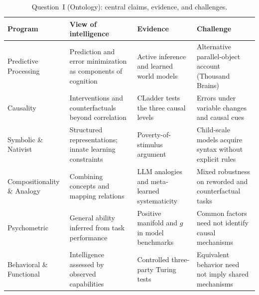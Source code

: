 \documentclass[acmsmall,screen,review,anonymous]{acmart}
\begin{document}
\begin{table}[t]
\caption{Question~I (Ontology): central claims, evidence, and challenges.}
\label{tab:ontology-framework}
\centering
\footnotesize
\setlength{\tabcolsep}{3pt}
\renewcommand{\arraystretch}{1.13}
\begin{tabularx}{\textwidth}{p{} Y Y Y}
\toprule
Program & View of intelligence & Evidence & Challenge \\
\midrule
Predictive Processing &
Prediction and error minimization as components of cognition~\citep{friston2010, clark2013} &
Active inference and learned world models~\citep{fountas2020deepactiveinferenceagents, hafner2020dreamcontrollearningbehaviors} &
Alternative parallel-object account (Thousand Brains)~\citep{hawkins2021thousand} \\
\addlinespace
Causality &
Interventions and counterfactuals beyond correlation~\citep{pearl2009, pearl2018} &
CLadder tests the three causal levels~\citep{jin2023cladder} &
Errors under variable changes and causal cues~\citep{jin2024largelanguagemodelsinfer, joshi-etal-2024-llms} \\
\addlinespace
Symbolic \& Nativist &
Structured representations; innate learning constraints~\citep{newellsimon1976, fodorpylyshyn1988, chomsky1959} &
Poverty-of-stimulus argument~\citep{aec7bd17-a4c8-3578-b764-35112067fc74} &
Child-scale models acquire syntax without explicit rules~\citep{warstadt2023babylm, huebner-etal-2021-babyberta} \\
\addlinespace
Compositionality \& Analogy &
Combining concepts and mapping relations~\citep{fodorpylyshyn1988, hofstadter2001} &
LLM analogies and meta-learned systematicity~\citep{Webb2022EmergentAR, Lake2023-ut} &
Mixed robustness on reworded and counterfactual tasks~\citep{lewis2024usingcounterfactualtasksevaluate, webb2025evidence} \\
\addlinespace
Psychometric &
General ability inferred from task performance~\citep{spearman1904} &
Positive manifold and $g$ in model benchmarks~\citep{burnell2023revealingstructurelanguagemodel} &
Common factors need not identify causal mechanisms~\citep{gardner1983, gould1996mismeasure} \\
\addlinespace
Behavioral \& Functional &
Intelligence assessed by observed capabilities~\citep{turing1950, dennett1987} &
Controlled three-party Turing tests~\citep{10.1145/3715275.3732108} &
Equivalent behavior need not imply shared mechanisms~\citep{Block1981PsychologismAB} \\
\bottomrule
\end{tabularx}
\end{table}
\end{document}
